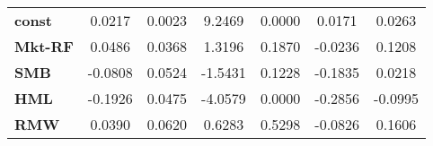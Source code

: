 \begin{center}
\begin{tabular}{lcccccc}
\midrule
\textbf{const}  &       0.0217       &       0.0023       &      9.2469     &      0.0000      &       0.0171      &       0.0263       \\
\textbf{Mkt-RF} &       0.0486       &       0.0368       &      1.3196     &      0.1870      &      -0.0236      &       0.1208       \\
\textbf{SMB}    &      -0.0808       &       0.0524       &     -1.5431     &      0.1228      &      -0.1835      &       0.0218       \\
\textbf{HML}    &      -0.1926       &       0.0475       &     -4.0579     &      0.0000      &      -0.2856      &      -0.0995       \\
\textbf{RMW}    &       0.0390       &       0.0620       &      0.6283     &      0.5298      &      -0.0826      &       0.1606       \\
\bottomrule
\end{tabular}
\end{center}
